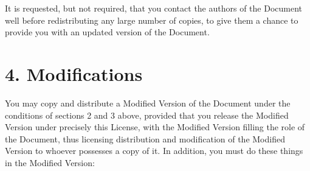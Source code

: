 \documentclass[12pt]{book}
\numberwithin{exc}{section}
\numberwithin{figure}{section}
\numberwithin{equation}{theorem}
\begin{document}
It is requested, but not required, that you contact the authors of the
Document well before redistributing any large number of copies, to give
them a chance to provide you with an updated version of the Document.

\section{4. Modifications}

You may copy and distribute a Modified Version of the Document under
the conditions of sections 2 and 3 above, provided that you release
the Modified Version under precisely this License, with the Modified
Version filling the role of the Document, thus licensing distribution
and modification of the Modified Version to whoever possesses a copy
of it.  In addition, you must do these things in the Modified Version:
\end{document}
